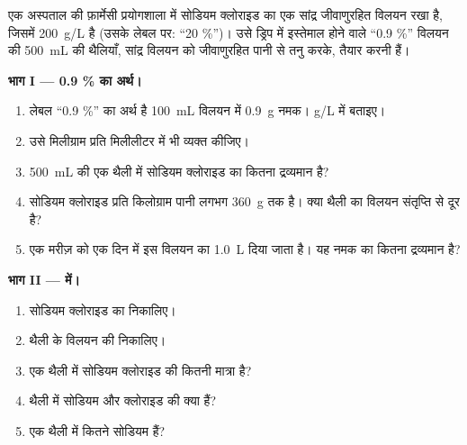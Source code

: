 \begin{problem}
\label{pb:g10:concentration-and-dilution:1}
एक अस्पताल की फ़ार्मेसी प्रयोगशाला में सोडियम क्लोराइड का एक सांद्र जीवाणुरहित विलयन
रखा है, जिसमें \qty{200}{g/L} है (उसके लेबल पर: ``20 \%'')। उसे ड्रिप में
इस्तेमाल होने वाले ``0.9 \%'' विलयन की \qty{500}{mL} की थैलियाँ, सांद्र विलयन को
जीवाणुरहित पानी से तनु करके, तैयार करनी हैं।

\medskip
\noindent\textbf{भाग I --- 0.9 \% का अर्थ।}
\begin{enumerate}
  \item लेबल ``0.9 \%'' का अर्थ है \qty{100}{mL} विलयन में \qty{0.9}{g}
        नमक।  \si{g/L} में बताइए।
  \item उसे मिलीग्राम प्रति मिलीलीटर में भी व्यक्त कीजिए।
  \item \qty{500}{mL} की एक थैली में सोडियम क्लोराइड का कितना द्रव्यमान है?
  \item सोडियम क्लोराइड प्रति किलोग्राम पानी लगभग \qty{360}{g} तक 
        है। क्या थैली का विलयन संतृप्ति से दूर है?
  \item एक मरीज़ को एक दिन में इस विलयन का \qty{1.0}{L} दिया जाता है। यह
        नमक का कितना द्रव्यमान है?
\end{enumerate}

\medskip
\noindent\textbf{भाग II ---  में।}
\begin{enumerate}[resume]
  \item सोडियम क्लोराइड का  निकालिए।
  \item थैली के विलयन की  निकालिए।
  \item एक थैली में सोडियम क्लोराइड की कितनी मात्रा है?
  \item थैली में सोडियम  और क्लोराइड  की 
        क्या हैं?
  \item एक थैली में कितने सोडियम  हैं?
\end{enumerate}


\end{problem}
